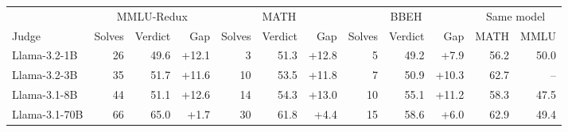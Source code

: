 \begin{tabular}{l rrr rrr rrr rr}
\toprule
& \multicolumn{3}{c}{MMLU-Redux} & \multicolumn{3}{c}{MATH} & \multicolumn{3}{c}{BBEH} & \multicolumn{2}{c}{Same model} \\
\cmidrule(lr){2-4}\cmidrule(lr){5-7}\cmidrule(lr){8-10}\cmidrule(l){11-12}
Judge & Solves & Verdict & Gap & Solves & Verdict & Gap & Solves & Verdict & Gap & MATH & MMLU \\
\midrule
Llama-3.2-1B & 26 & 49.6 & +12.1 & 3 & 51.3 & +12.8 & 5 & 49.2 & +7.9 & 56.2 & 50.0 \\
Llama-3.2-3B & 35 & 51.7 & +11.6 & 10 & 53.5 & +11.8 & 7 & 50.9 & +10.3 & 62.7 & -- \\
Llama-3.1-8B & 44 & 51.1 & +12.6 & 14 & 54.3 & +13.0 & 10 & 55.1 & +11.2 & 58.3 & 47.5 \\
Llama-3.1-70B & 66 & 65.0 & +1.7 & 30 & 61.8 & +4.4 & 15 & 58.6 & +6.0 & 62.9 & 49.4 \\
\bottomrule
\end{tabular}
